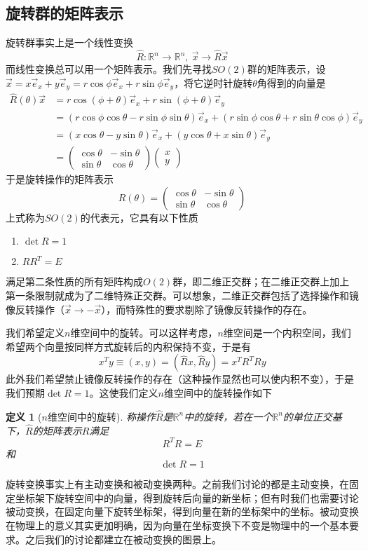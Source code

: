 \documentclass[a4paper,11pt]{ctexart}
\newcommand{\beq}{\begin{equation}}
\newcommand{\eeq}{\end{equation}}
\newcommand{\bea}{\begin{equation}\begin{aligned}}
\newcommand{\eea}{\end{aligned}\end{equation}}
\newcommand{\reals}{\mathbb{R}}
\newtheorem{dfn}{定义}[section]
\begin{document}
\subsection{旋转群的矩阵表示}
旋转群事实上是一个线性变换
\beq
\hat{R}: \reals^n \to \reals^n,\ \vec{x} \to \hat{R} \vec{x}
\eeq
而线性变换总可以用一个矩阵表示。我们先寻找$SO(2)$群的矩阵表示，设$\vec{x} = x \vec{e}_x + y \vec{e}_y = r\cos \phi \vec{e}_x + r\sin \phi \vec{e}_y$，将它逆时针旋转$\theta$角得到的向量是
\bea
\hat{R}(\theta) \vec{x} &= r \cos(\phi + \theta) \vec{e}_x + r \sin(\phi + \theta) \vec{e}_y \\
&= (r\cos \phi \cos \theta - r \sin \phi \sin \theta)\vec{e}_x + (r \sin \phi \cos \theta + r \sin \theta \cos \phi) \vec{e}_y \\
&= (x \cos \theta - y \sin \theta) \vec{e}_x + (y \cos \theta + x \sin \theta) \vec{e}_y \\
&= \begin{pmatrix}
\cos \theta & - \sin \theta \\
\sin \theta & \cos \theta
\end{pmatrix}
\begin{pmatrix}
x \\
y
\end{pmatrix}
\eea
于是旋转操作的矩阵表示
\beq
R(\theta) = \begin{pmatrix}
\cos \theta & - \sin \theta \\
\sin \theta & \cos \theta
\end{pmatrix}
\eeq
上式称为$SO(2)$的代表元，它具有以下性质
\begin{enumerate}
\item $\det R = 1$
\item $RR^T = E$
\end{enumerate}
满足第二条性质的所有矩阵构成$O(2)$群，即二维正交群；在二维正交群上加上第一条限制就成为了二维特殊正交群。可以想象，二维正交群包括了选择操作和镜像反转操作（$\vec{x} \to -\vec{x}$），而特殊性的要求剔除了镜像反转操作的存在。\par
我们希望定义$n$维空间中的旋转。可以这样考虑，$n$维空间是一个内积空间，我们希望两个向量按同样方式旋转后的内积保持不变，于是有
\beq
x^T y \equiv (x,y)  = (\hat{R} x,\hat{R} y) = x^T R^T R y
\eeq
此外我们希望禁止镜像反转操作的存在（这种操作显然也可以使内积不变），于是我们预期$\det R = 1$。这使我们定义$n$维空间中的旋转操作如下
\begin{dfn}[$n$维空间中的旋转]
称操作$\hat{R}$是$\reals^n$中的旋转，若在一个$\reals^n$的单位正交基下，$\hat{R}$的矩阵表示$R$满足
\beq
R^T R= E
\eeq
和
\beq
\det R = 1
\eeq
\end{dfn}
旋转变换事实上有主动变换和被动变换两种。之前我们讨论的都是主动变换，在固定坐标架下旋转空间中的向量，得到旋转后向量的新坐标；但有时我们也需要讨论被动变换，在固定向量下旋转坐标架，得到向量在新的坐标架中的坐标。被动变换在物理上的意义其实更加明确，因为向量在坐标变换下不变是物理中的一个基本要求。之后我们的讨论都建立在被动变换的图景上。
\end{document}
